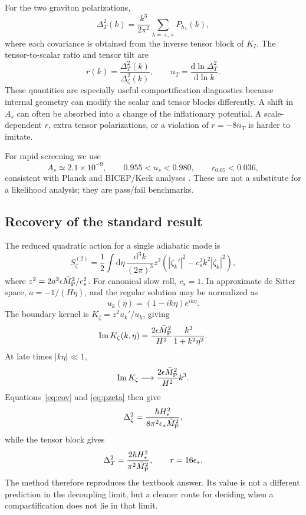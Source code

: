 \documentclass[aps,prd,twocolumn,superscriptaddress,nofootinbib,longbibliography]{revtex4-2}
\newcommand{\Mpl}{\bar M_{\rm P}}
\newcommand{\dd}{\mathrm d}
\begin{document}
For the two graviton polarizations,
\begin{equation}
\Delta_T^2(k)=\frac{k^3}{2\pi^2}\sum_{\lambda=+,\times}P_{h_\lambda}(k),
\end{equation}
where each covariance is obtained from the inverse tensor block of $K_I$. The tensor-to-scalar ratio and tensor tilt are
\begin{equation}
r(k)=\frac{\Delta_T^2(k)}{\Delta_\zeta^2(k)},\qquad
n_T=\frac{\dd\ln\Delta_T^2}{\dd\ln k}.
\end{equation}
These quantities are especially useful compactification diagnostics because internal geometry can modify the scalar and tensor blocks differently. A shift in $A_s$ can often be absorbed into a change of the inflationary potential. A scale-dependent $r$, extra tensor polarizations, or a violation of $r=-8n_T$ is harder to imitate.

For rapid screening we use
\begin{equation}
A_s\simeq2.1\times10^{-9},\qquad
0.955<n_s<0.980,\qquad r_{0.05}<0.036,
\label{eq:screen}
\end{equation}
consistent with Planck and BICEP/Keck analyses \cite{PlanckInflation2020,BICEPKeck2021,BICEPKeckReview2024}. These are not a substitute for a likelihood analysis; they are pass/fail benchmarks.

\subsection{Recovery of the standard result}
The reduced quadratic action for a single adiabatic mode is
\begin{equation}
S_\zeta^{(2)}=\frac12\int\dd\eta\,\frac{\dd^3k}{(2\pi)^3}z^2
\left(|\zeta_k'|^2-c_s^2k^2|\zeta_k|^2\right),
\end{equation}
where $z^2=2a^2\epsilon\Mpl^2/c_s^2$. For canonical slow roll, $c_s=1$. In approximate de Sitter space, $a=-1/(H\eta)$, and the regular solution may be normalized as
\begin{equation}
u_k(\eta)=(1-ik\eta)e^{ik\eta}.
\end{equation}
The boundary kernel is $K_\zeta=z^2u_k'/u_k$, giving
\begin{equation}
\operatorname{Im}K_\zeta(k,\eta)=
\frac{2\epsilon\Mpl^2}{H^2}\frac{k^3}{1+k^2\eta^2}.
\end{equation}
At late times $|k\eta|\ll1$,
\begin{equation}
\operatorname{Im}K_\zeta\longrightarrow
\frac{2\epsilon\Mpl^2}{H^2}k^3.
\end{equation}
Equations~\eqref{eq:cov} and \eqref{eq:pzeta} then give
\begin{equation}
\Delta_\zeta^2=\frac{\hbar H_*^2}{8\pi^2\epsilon_*\Mpl^2},
\end{equation}
while the tensor block gives
\begin{equation}
\Delta_T^2=\frac{2\hbar H_*^2}{\pi^2\Mpl^2},\qquad r=16\epsilon_*.
\end{equation}
The method therefore reproduces the textbook answer. Its value is not a different prediction in the decoupling limit, but a cleaner route for deciding when a compactification does not lie in that limit.
\end{document}
